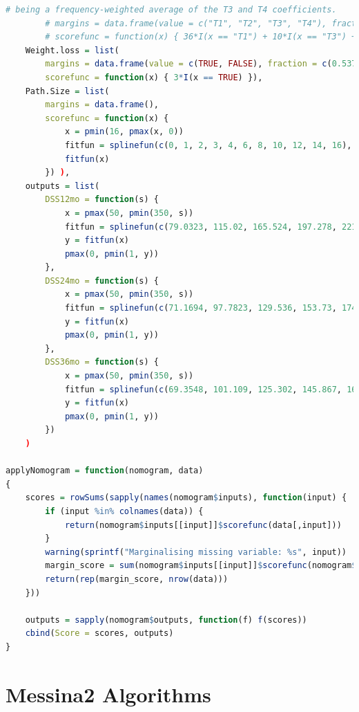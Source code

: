 \begin{lstlisting}[language=R]
		# being a frequency-weighted average of the T3 and T4 coefficients.
		# margins = data.frame(value = c("T1", "T2", "T3", "T4"), fraction = c(0.037, 0.119, 0.828, 1-0.037-0.119-0.828)),
		# scorefunc = function(x) { 36*I(x == "T1") + 10*I(x == "T3") + 63*I(x == "T4") }),
	Weight.loss = list(
		margins = data.frame(value = c(TRUE, FALSE), fraction = c(0.537, 1-0.537)),
		scorefunc = function(x) { 3*I(x == TRUE) }),
	Path.Size = list(
		margins = data.frame(),
		scorefunc = function(x) {
			x = pmin(16, pmax(x, 0))
			fitfun = splinefun(c(0, 1, 2, 3, 4, 6, 8, 10, 12, 14, 16), c(0, 29.74, 59.48, 86.70, 100, 97.29, 90.03, 82.77, 75.51, 68.25, 61.10), method = "natural")
			fitfun(x)
		}) ),
	outputs = list(
		DSS12mo = function(s) {
			x = pmax(50, pmin(350, s))
			fitfun = splinefun(c(79.0323, 115.02, 165.524, 197.278, 221.774, 242.339, 261.089, 279.839, 299.194, 323.992, 337.298), c(0.94, 0.9, 0.8, 0.7, 0.6, 0.5, 0.4, 0.3, 0.2, 0.1, 0.06))
			y = fitfun(x)
			pmax(0, pmin(1, y))
		},
		DSS24mo = function(s) {
			x = pmax(50, pmin(350, s))
			fitfun = splinefun(c(71.1694, 97.7823, 129.536, 153.73, 174.294, 193.347, 211.794, 231.452, 255.645, 303.125), c(0.86, 0.8, 0.7, 0.6, 0.5, 0.4, 0.3, 0.2, 0.1, 0.01))
			y = fitfun(x)
			pmax(0, pmin(1, y))
		},
		DSS36mo = function(s) {
			x = pmax(50, pmin(350, s))
			fitfun = splinefun(c(69.3548, 101.109, 125.302, 145.867, 164.919, 183.367, 202.722, 226.915, 274.093), c(0.8, 0.7, 0.6, 0.5, 0.4, 0.3, 0.2, 0.1, 0.01))
			y = fitfun(x)
			pmax(0, pmin(1, y))
		}) 
	)

applyNomogram = function(nomogram, data)
{
	scores = rowSums(sapply(names(nomogram$inputs), function(input) {
		if (input %in% colnames(data)) {
			return(nomogram$inputs[[input]]$scorefunc(data[,input]))
		}
		warning(sprintf("Marginalising missing variable: %s", input))
		margin_score = sum(nomogram$inputs[[input]]$scorefunc(nomogram$inputs[[input]]$margins$value) * nomogram$inputs[[input]]$margins$fraction)
		return(rep(margin_score, nrow(data)))
	}))

	outputs = sapply(nomogram$outputs, function(f) f(scores))
	cbind(Score = scores, outputs)
}
\end{lstlisting}





\chapter{Messina2 Algorithms}
\label{app:mess-algos}


